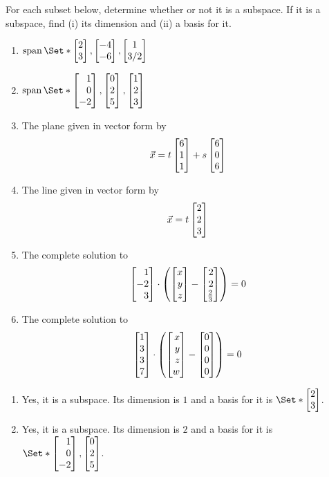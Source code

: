 \begin{exercises}
\begin{problist}
		\prob For each subset below, determine whether or not it is a subspace.
		If it is a subspace, find (i) its dimension and (ii) a basis for it.
		\begin{enumerate}
			\item $\Span\Set*{\mat{2\\3}, \mat{-4\\-6}, \matc{1\\3/2}}$
			\item $\Span\Set*{\mat{1\\0\\-2}, \mat{0\\2\\5}, \mat{1\\2\\3}}$
			\item The plane given in vector form by
			\[
				\vec x = t\mat{6\\1\\1}+s\mat{6\\0\\6}
			\]
			\item The line given in vector form by
			\[
				\vec x = t\mat{2\\2\\3}
			\]
			\item The complete solution to
			\[
				\mat{1\\-2\\3} \cdot \left(\mat{x\\y\\z}-\mat{2\\2\\\frac{2}{3}}\right)=0
			\]
			\item The complete solution to
			\[
				\mat{1\\3\\3\\7} \cdot \left(\mat{x\\y\\z\\w}-\mat{0\\0\\0\\0}\right)=0
			\]
		\end{enumerate}
		\begin{solution}
			\begin{enumerate}
				\item Yes, it is a subspace. Its dimension is $1$ and a basis for it is $\Set*{\mat{2\\3}}$.

				\item Yes, it is a subspace. Its dimension is $2$ and a basis for it is $\Set*{\mat{1\\0\\-2},\mat{0\\2\\5}}$.


\end{enumerate}
\end{solution}
\end{problist}
\end{exercises}
